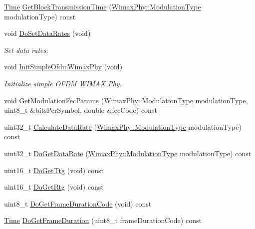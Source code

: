 \begin{DoxyCompactItemize}
\item 
\hyperlink{classns3_1_1Time}{Time} \hyperlink{classns3_1_1SimpleOfdmWimaxPhy_a85c175d6f5999f256a6f37a8ecc2fb00}{Get\+Block\+Transmission\+Time} (\hyperlink{classns3_1_1WimaxPhy_a044c5d8a48ca992c39c2a946f6e755fa}{Wimax\+Phy\+::\+Modulation\+Type} modulation\+Type) const 
\item 
void \hyperlink{classns3_1_1SimpleOfdmWimaxPhy_ae036ca37d85b2ec3f63deb56fce726c7}{Do\+Set\+Data\+Rates} (void)
\begin{DoxyCompactList}\small\item\em Set data rates. \end{DoxyCompactList}\item 
void \hyperlink{classns3_1_1SimpleOfdmWimaxPhy_abfdfe2c510925a4e965f95ff745888e3}{Init\+Simple\+Ofdm\+Wimax\+Phy} (void)
\begin{DoxyCompactList}\small\item\em Initialize simple O\+F\+DM W\+I\+M\+AX Phy. \end{DoxyCompactList}\item 
void \hyperlink{classns3_1_1SimpleOfdmWimaxPhy_a2729f5f6564883b4ec940fd7a5a63506}{Get\+Modulation\+Fec\+Params} (\hyperlink{classns3_1_1WimaxPhy_a044c5d8a48ca992c39c2a946f6e755fa}{Wimax\+Phy\+::\+Modulation\+Type} modulation\+Type, uint8\+\_\+t \&bits\+Per\+Symbol, double \&fec\+Code) const 
\item 
uint32\+\_\+t \hyperlink{classns3_1_1SimpleOfdmWimaxPhy_a7e4fb0a8c4d824c0d40c94699acd6bb5}{Calculate\+Data\+Rate} (\hyperlink{classns3_1_1WimaxPhy_a044c5d8a48ca992c39c2a946f6e755fa}{Wimax\+Phy\+::\+Modulation\+Type} modulation\+Type) const 
\item 
uint32\+\_\+t \hyperlink{classns3_1_1SimpleOfdmWimaxPhy_a16e96c2f7c23fb37ee7a7715a2f629ce}{Do\+Get\+Data\+Rate} (\hyperlink{classns3_1_1WimaxPhy_a044c5d8a48ca992c39c2a946f6e755fa}{Wimax\+Phy\+::\+Modulation\+Type} modulation\+Type) const 
\item 
uint16\+\_\+t \hyperlink{classns3_1_1SimpleOfdmWimaxPhy_aa597e5dc69aaa386fcd34d7456bfd815}{Do\+Get\+Ttg} (void) const 
\item 
uint16\+\_\+t \hyperlink{classns3_1_1SimpleOfdmWimaxPhy_aa2fbb6dce346acb8885e217f76106ea7}{Do\+Get\+Rtg} (void) const 
\item 
uint8\+\_\+t \hyperlink{classns3_1_1SimpleOfdmWimaxPhy_a9a7aee8b0f6f2eb2f8d2cfaf345b9450}{Do\+Get\+Frame\+Duration\+Code} (void) const 
\item 
\hyperlink{classns3_1_1Time}{Time} \hyperlink{classns3_1_1SimpleOfdmWimaxPhy_acbd43f696d7e15c6c2c8578858192987}{Do\+Get\+Frame\+Duration} (uint8\+\_\+t frame\+Duration\+Code) const 

\end{DoxyCompactItemize}
